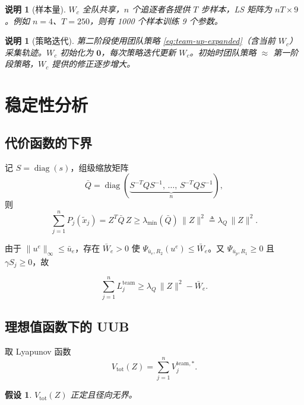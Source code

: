 \documentclass[12pt,a4paper]{ctexart}
\newtheorem{assumption}[theorem]{假设}
\newtheorem{remark}[theorem]{说明}
\DeclareMathOperator{\diag}{diag}
\begin{document}
\begin{remark}[样本量]
$W_c$ 全队共享，$n$ 个追逐者各提供 $T$ 步样本，LS 矩阵为 $nT \times 9$。例如 $n = 4$、$T = 250$，则有 1000 个样本训练 9 个参数。
\end{remark}

\begin{remark}[策略迭代]
第二阶段使用团队策略 \eqref{eq:team-up-expanded}（含当前 $W_c$）采集轨迹。$W_c$ 初始化为 $\bm{0}$，每次策略迭代更新 $W_c$。初始时团队策略 $\approx$ 第一阶段策略，$W_c$ 提供的修正逐步增大。
\end{remark}


\section{稳定性分析}

\subsection{代价函数的下界}

记 $S = \diag(s)$，组级缩放矩阵
\[
\bar{Q} = \diag(\underbrace{S^{-T}QS^{-1},\, \dots,\, S^{-T}QS^{-1}}_{n}),
\]
则
\begin{equation}
\sum_{j=1}^{n} P_j(\tilde{x}_j) = Z^T \bar{Q}\,Z \ge \lambda_{\min}(\bar{Q})\,\|Z\|^2 \triangleq \lambda_Q\,\|Z\|^2.
\end{equation}

由于 $\|u^e\|_\infty \le \bar{u}_e$，存在 $\bar{W}_e > 0$ 使 $\Psi_{\bar{u}_e, R_2}(u^e) \le \bar{W}_e$。又 $\Psi_{\bar{u}_p, R_1} \ge 0$ 且 $\gamma S_j \ge 0$，故

\begin{equation}\label{eq:cost-lower-bound}
\sum_{j=1}^{n} L_j^{\mathrm{team}} \ge \lambda_Q\,\|Z\|^2 - \bar{W}_e.
\end{equation}

\subsection{理想值函数下的 UUB}

取 Lyapunov 函数
\[
V_{\mathrm{tot}}(Z) = \sum_{j=1}^{n} V_j^{\mathrm{team},*}.
\]

\begin{assumption}\label{ass:V-pd}
$V_{\mathrm{tot}}(Z)$ 正定且径向无界。
\end{assumption}
\end{document}
